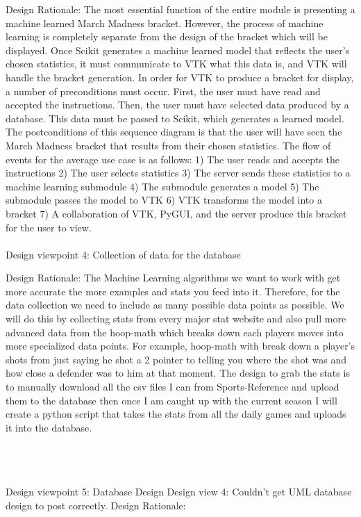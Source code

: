 \documentclass[journal,onecolumn]{IEEEtran}
\begin{document}
{\large Design Rationale:}
The most essential function of the entire module is presenting a machine learned March Madness bracket. However, the process of machine learning is completely separate from the design of the bracket which will be displayed. Once Scikit generates a machine learned model that reflects the user's chosen statistics, it must communicate to VTK what this data is, and VTK will handle the bracket generation. In order for VTK to produce a bracket for display, a number of preconditions must occur. First, the user must have read and accepted the instructions. Then, the user must have selected data produced by a database. This data must be passed to Scikit, which generates a learned model. The postconditions of this sequence diagram is that the user will have seen the March Madness bracket that results from their chosen statistics. The flow of events for the average use case is as follows: 1) The user reads and accepts the instructions 2) The user selects statistics 3) The server sends these statistics to a machine learning submodule 4) The submodule generates a model 5) The submodule passes the model to VTK 6) VTK transforms the model into a bracket 7) A collaboration of VTK, PyGUI, and the server produce this bracket for the user to view.
\\
\\

{\large Design viewpoint 4: Collection of data for the database}

{\large Design Rationale:}
The Machine Learning algorithms we want to work with get more accurate the more examples and stats you feed into it. Therefore, for the data collection we need to include as many possible data points as possible. We will do this by collecting stats from every major stat website and also pull more advanced data from the hoop-math which breaks down each players moves into more specialized data points. For example, hoop-math with break down a player’s shots from just saying he shot a 2 pointer to telling you where the shot was and how close a defender was to him at that moment. The design to grab the stats is to manually download all the csv files I can from Sports-Reference and upload them to the database then once I am caught up with the current season I will create a python script that takes the stats from all the daily games and uploads it into the database. 

\\
\\
\\
{\large Design viewpoint 5: Database Design}
Design view 4:
Couldn’t get UML database design to post correctly.
{\large Design Rationale:}
\end{document}
